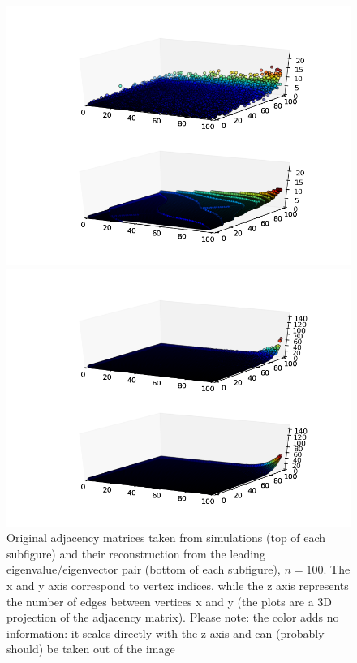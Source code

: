 \documentclass[11pt]{article}
\begin{document}
\begin{figure}[h!]
  \begin{minipage}[c][10cm][t]{.9\textwidth}
    \centering
    \includegraphics[width=12cm]{adjReconShort100}
  \end{minipage}
  \begin{minipage}[c][10cm][t]{.9\textwidth}
    \centering
    \includegraphics[width=12cm]{adjReconLong100}
  \end{minipage}
  \caption{Original adjacency matrices taken from simulations (top of each subfigure) and their reconstruction from the leading eigenvalue/eigenvector pair (bottom of each subfigure), $n=100$. The x and y axis correspond to  vertex indices, while the z axis represents the number of edges between vertices x and y (the plots are a 3D projection of the adjacency matrix). Please note: the color adds no information: it scales directly with the z-axis and can (probably should) be taken out of the image}
  \label{fig:adjRecon}
\end{figure}
 
\end{document}

